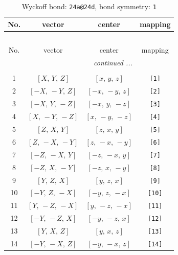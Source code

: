 \documentclass[fleqn,8pt]{jsarticle}
\begin{document}
\begin{longtable}{cccc}
\caption{Wyckoff bond: {\tt 24a@24d}, bond symmetry: {\tt 1}}
 \\
 \hline \hline
No. & vector & center & mapping \\ \hline \endfirsthead

\multicolumn{3}{l}{\tablename\ \thetable{}} \\
 \hline \hline
No. & vector & center & mapping \\ \hline \endhead

 \hline \hline
\multicolumn{3}{r}{\footnotesize\it continued ...} \\ \endfoot

 \hline \hline
\multicolumn{3}{r}{} \\ \endlastfoot

1 & $\left[ X,\, Y,\, Z \right]$ & $\left[ x,\, y,\, z \right]$ & {\tt [1]} \\ \hline
2 & $\left[ - X,\, - Y,\, Z \right]$ & $\left[ - x,\, - y,\, z \right]$ & {\tt [2]} \\ \hline
3 & $\left[ - X,\, Y,\, - Z \right]$ & $\left[ - x,\, y,\, - z \right]$ & {\tt [3]} \\ \hline
4 & $\left[ X,\, - Y,\, - Z \right]$ & $\left[ x,\, - y,\, - z \right]$ & {\tt [4]} \\ \hline
5 & $\left[ Z,\, X,\, Y \right]$ & $\left[ z,\, x,\, y \right]$ & {\tt [5]} \\ \hline
6 & $\left[ Z,\, - X,\, - Y \right]$ & $\left[ z,\, - x,\, - y \right]$ & {\tt [6]} \\ \hline
7 & $\left[ - Z,\, - X,\, Y \right]$ & $\left[ - z,\, - x,\, y \right]$ & {\tt [7]} \\ \hline
8 & $\left[ - Z,\, X,\, - Y \right]$ & $\left[ - z,\, x,\, - y \right]$ & {\tt [8]} \\ \hline
9 & $\left[ Y,\, Z,\, X \right]$ & $\left[ y,\, z,\, x \right]$ & {\tt [9]} \\ \hline
10 & $\left[ - Y,\, Z,\, - X \right]$ & $\left[ - y,\, z,\, - x \right]$ & {\tt [10]} \\ \hline
11 & $\left[ Y,\, - Z,\, - X \right]$ & $\left[ y,\, - z,\, - x \right]$ & {\tt [11]} \\ \hline
12 & $\left[ - Y,\, - Z,\, X \right]$ & $\left[ - y,\, - z,\, x \right]$ & {\tt [12]} \\ \hline
13 & $\left[ Y,\, X,\, Z \right]$ & $\left[ y,\, x,\, z \right]$ & {\tt [13]} \\ \hline
14 & $\left[ - Y,\, - X,\, Z \right]$ & $\left[ - y,\, - x,\, z \right]$ & {\tt [14]} \\ \hline

\end{longtable}
\end{document}
